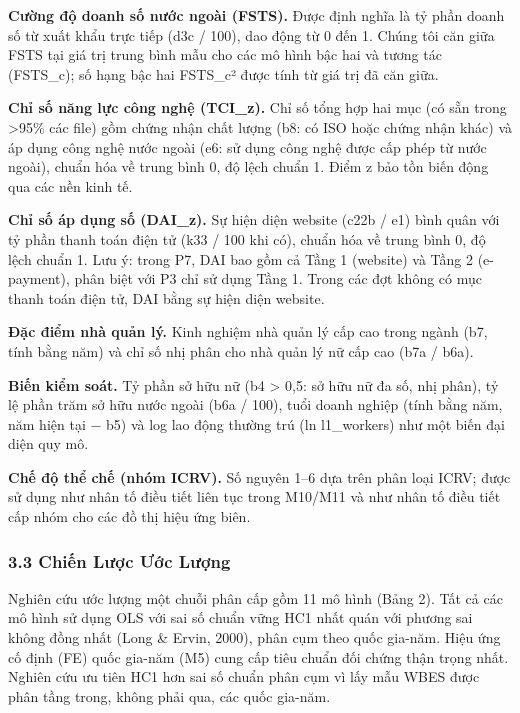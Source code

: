 \documentclass[12pt,a4paper]{article}
\begin{document}
\textbf{Cường độ doanh số nước ngoài (FSTS).} Được định nghĩa là tỷ phần
doanh số từ xuất khẩu trực tiếp (d3c / 100), dao động từ 0 đến 1. Chúng
tôi căn giữa FSTS tại giá trị trung bình mẫu cho các mô hình bậc hai và
tương tác (FSTS\_c); số hạng bậc hai FSTS\_c² được tính từ giá trị đã
căn giữa.

\textbf{Chỉ số năng lực công nghệ (TCI\_z).} Chỉ số tổng hợp hai mục (có
sẵn trong \textgreater95\% các file) gồm chứng nhận chất lượng (b8: có
ISO hoặc chứng nhận khác) và áp dụng công nghệ nước ngoài (e6: sử dụng
công nghệ được cấp phép từ nước ngoài), chuẩn hóa về trung bình 0, độ
lệch chuẩn 1. Điểm z bảo tồn biến động qua các nền kinh tế.

\textbf{Chỉ số áp dụng số (DAI\_z).} Sự hiện diện website (c22b / e1)
bình quân với tỷ phần thanh toán điện tử (k33 / 100 khi có), chuẩn hóa
về trung bình 0, độ lệch chuẩn 1. Lưu ý: trong P7, DAI bao gồm cả Tầng 1
(website) và Tầng 2 (e-payment), phân biệt với P3 chỉ sử dụng Tầng 1.
Trong các đợt không có mục thanh toán điện tử, DAI bằng sự hiện diện
website.

\textbf{Đặc điểm nhà quản lý.} Kinh nghiệm nhà quản lý cấp cao trong
ngành (b7, tính bằng năm) và chỉ số nhị phân cho nhà quản lý nữ cấp cao
(b7a / b6a).

\textbf{Biến kiểm soát.} Tỷ phần sở hữu nữ (b4 \textgreater{} 0,5: sở
hữu nữ đa số, nhị phân), tỷ lệ phần trăm sở hữu nước ngoài (b6a / 100),
tuổi doanh nghiệp (tính bằng năm, năm hiện tại − b5) và log lao động
thường trú (ln l1\_workers) như một biến đại diện quy mô.

\textbf{Chế độ thể chế (nhóm ICRV).} Số nguyên 1--6 dựa trên phân loại
ICRV; được sử dụng như nhân tố điều tiết liên tục trong M10/M11 và như
nhân tố điều tiết cấp nhóm cho các đồ thị hiệu ứng biên.

\hypertarget{33-chiux1ebfn-lux1b0ux1ee3c-ux1b0ux1edbc-lux1b0ux1ee3ng}{%
\subsubsection{3.3 Chiến Lược Ước
Lượng}\label{33-chiux1ebfn-lux1b0ux1ee3c-ux1b0ux1edbc-lux1b0ux1ee3ng}}

Nghiên cứu ước lượng một chuỗi phân cấp gồm 11 mô hình (Bảng 2). Tất cả
các mô hình sử dụng OLS với sai số chuẩn vững HC1 nhất quán với phương
sai không đồng nhất (Long \& Ervin, 2000), phân cụm theo quốc gia-năm.
Hiệu ứng cố định (FE) quốc gia-năm (M5) cung cấp tiêu chuẩn đối chứng
thận trọng nhất. Nghiên cứu ưu tiên HC1 hơn sai số chuẩn phân cụm vì lấy
mẫu WBES được phân tầng trong, không phải qua, các quốc gia-năm.
\end{document}
